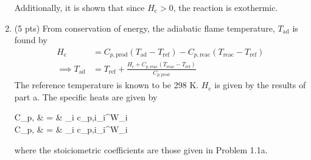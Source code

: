 \documentclass[12pt]{article}
\begin{document}
\begin{enumerate}[label=(\alph*)]
		Additionally, it is shown that since $H_\mathrm{c}>0$, the reaction is $\boxed{\mathrm{exothermic}}$.	
		\item (5 pts)
			From conservation of energy, the adiabatic flame temperature, $T_\mathrm{ad}$ is found by
			\begin{equation}
				\begin{aligned}
					H_\mathrm{c}&=C_{p,\mathrm{prod}}(T_\mathrm{ad}-T_\mathrm{ref})-C_{p,\mathrm{reac}}(T_\mathrm{reac}-T_\mathrm{ref})\\
					\implies T_\mathrm{ad}&=\boxed{T_\mathrm{ref}+\frac{H_\mathrm{c}+C_{p,\mathrm{reac}}(T_\mathrm{reac}-T_\mathrm{ref})}{C_{p,\mathrm{prod}}}}
				\end{aligned}
			\end{equation}
			The reference temperature is known to be 298 K. $H_\mathrm{c}$ is given by the results of part a. The specific heats are given by \\
			\begin{subeqnarray}
				C_{p,} & = & \sum_i c_{p,i}\nu_i^{\prime\prime}W_i\\
				C_{p,} & = & \sum_i c_{p,i}\nu_i^{\prime}W_i
			\end{subeqnarray}
			where the stoiciometric coefficients are those given in Problem 1.1a. 
			

\end{enumerate}
\end{document}
